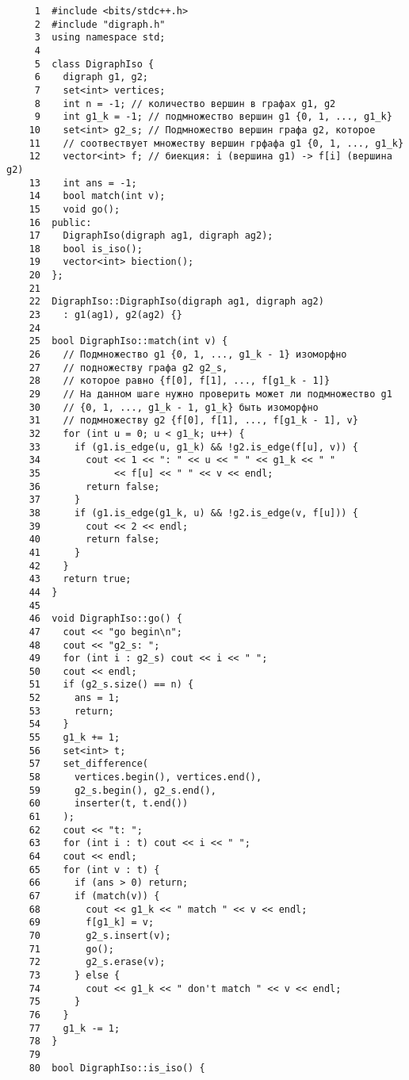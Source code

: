 \begin{verbatim}
     1	#include <bits/stdc++.h>
     2	#include "digraph.h"
     3	using namespace std;
     4	
     5	class DigraphIso {
     6	  digraph g1, g2;
     7	  set<int> vertices;
     8	  int n = -1; // количество вершин в графах g1, g2
     9	  int g1_k = -1; // подмножество вершин g1 {0, 1, ..., g1_k}
    10	  set<int> g2_s; // Подмножество вершин графа g2, которое
    11	  // соотвествует множеству вершин грфафа g1 {0, 1, ..., g1_k}
    12	  vector<int> f; // биекция: i (вершина g1) -> f[i] (вершина g2)
    13	  int ans = -1;
    14	  bool match(int v);
    15	  void go();
    16	public:
    17	  DigraphIso(digraph ag1, digraph ag2);
    18	  bool is_iso();
    19	  vector<int> biection();
    20	};
    21	
    22	DigraphIso::DigraphIso(digraph ag1, digraph ag2)
    23	  : g1(ag1), g2(ag2) {}
    24	
    25	bool DigraphIso::match(int v) {
    26	  // Подмножество g1 {0, 1, ..., g1_k - 1} изоморфно
    27	  // подножеству графа g2 g2_s,
    28	  // которое равно {f[0], f[1], ..., f[g1_k - 1]}
    29	  // На данном шаге нужно проверить может ли подмножество g1
    30	  // {0, 1, ..., g1_k - 1, g1_k} быть изоморфно
    31	  // подмножеству g2 {f[0], f[1], ..., f[g1_k - 1], v}
    32	  for (int u = 0; u < g1_k; u++) {
    33	    if (g1.is_edge(u, g1_k) && !g2.is_edge(f[u], v)) {
    34	      cout << 1 << ": " << u << " " << g1_k << " "
    35	           << f[u] << " " << v << endl;
    36	      return false;
    37	    }
    38	    if (g1.is_edge(g1_k, u) && !g2.is_edge(v, f[u])) {
    39	      cout << 2 << endl;
    40	      return false;
    41	    }
    42	  }
    43	  return true;
    44	}
    45	
    46	void DigraphIso::go() {
    47	  cout << "go begin\n";
    48	  cout << "g2_s: ";
    49	  for (int i : g2_s) cout << i << " ";
    50	  cout << endl;
    51	  if (g2_s.size() == n) {
    52	    ans = 1;
    53	    return;
    54	  }
    55	  g1_k += 1;
    56	  set<int> t;
    57	  set_difference(
    58	    vertices.begin(), vertices.end(),
    59	    g2_s.begin(), g2_s.end(),
    60	    inserter(t, t.end())
    61	  );
    62	  cout << "t: ";
    63	  for (int i : t) cout << i << " ";
    64	  cout << endl;
    65	  for (int v : t) {
    66	    if (ans > 0) return;
    67	    if (match(v)) {
    68	      cout << g1_k << " match " << v << endl;
    69	      f[g1_k] = v;
    70	      g2_s.insert(v);
    71	      go();
    72	      g2_s.erase(v);
    73	    } else {
    74	      cout << g1_k << " don't match " << v << endl;
    75	    }
    76	  }
    77	  g1_k -= 1;
    78	}
    79	
    80	bool DigraphIso::is_iso() {

\end{verbatim}
